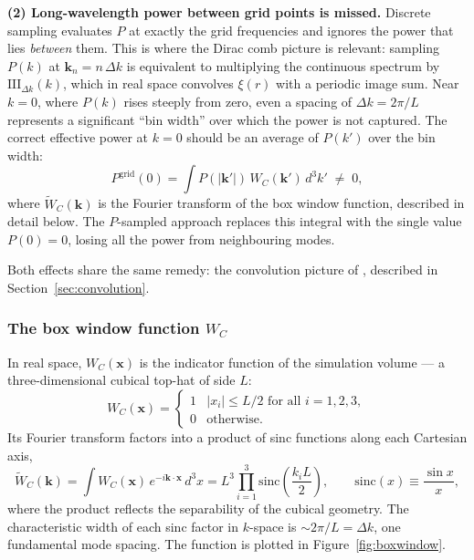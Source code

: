 \documentclass[12pt]{article}
\begin{document}
\textbf{(2) Long-wavelength power between grid points is missed.}
Discrete sampling evaluates $P$ at exactly the grid frequencies and
ignores the power that lies \emph{between} them.  This is where the
Dirac comb picture is relevant: sampling $P(k)$ at $\mathbf{k}_n =
n\,\Delta k$ is equivalent to multiplying the continuous spectrum by
$\mathrm{III}_{\Delta k}(k)$, which in real space convolves $\xi(r)$
with a periodic image sum.  Near $k = 0$, where $P(k)$ rises steeply
from zero, even a spacing of $\Delta k = 2\pi/L$ represents a
significant ``bin width'' over which the power is not captured.  The
correct effective power at $k = 0$ should be an average of $P(k')$
over the bin width:
\begin{equation}
  P^\mathrm{grid}(0) = \int P(|\mathbf{k}'|)\,W_C(\mathbf{k}')\,d^3k'
  \;\neq\; 0,
  \label{eq:pgrid0}
\end{equation}
where $\tilde{W}_C(\mathbf{k})$ is the Fourier transform of the box
window function, described in detail below.  The $P$-sampled approach
replaces this integral with the single value $P(0) = 0$, losing all
the power from neighbouring modes.

Both effects share the same remedy: the convolution picture of
\citet{Pen1997}, described in Section~\ref{sec:convolution}.

\subsubsection*{The box window function $W_C$}

In real space, $W_C(\mathbf{x})$ is the indicator function of the
simulation volume --- a three-dimensional cubical top-hat of side $L$:
\begin{equation}
  W_C(\mathbf{x}) = \begin{cases}
    1 & |x_i| \leq L/2 \text{ for all } i = 1,2,3, \\
    0 & \text{otherwise.}
  \end{cases}
\end{equation}
Its Fourier transform factors into a product of sinc functions along
each Cartesian axis,
\begin{equation}
  \tilde{W}_C(\mathbf{k})
  = \int W_C(\mathbf{x})\,e^{-i\mathbf{k}\cdot\mathbf{x}}\,d^3x
  = L^3 \prod_{i=1}^{3} \mathrm{sinc}\!\left(\frac{k_i L}{2}\right),
  \qquad \mathrm{sinc}(x) \equiv \frac{\sin x}{x},
  \label{eq:WC}
\end{equation}
where the product reflects the separability of the cubical geometry.
The characteristic width of each sinc factor in $k$-space is
$\sim 2\pi/L = \Delta k$, one fundamental mode spacing.  The function
is plotted in Figure~\ref{fig:boxwindow}.
\end{document}
